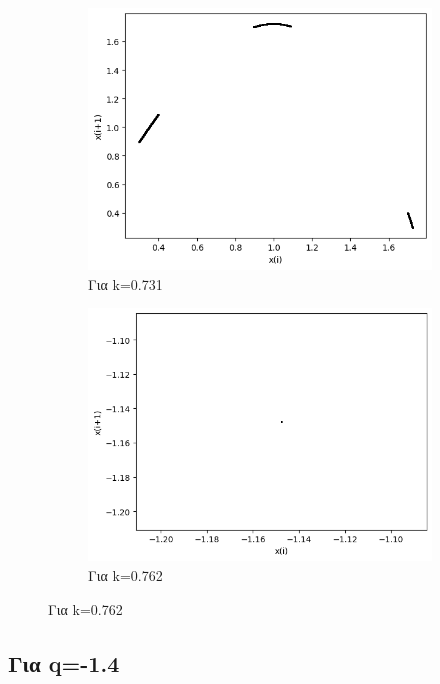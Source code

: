 \begin{figure}[h!]
\begin{subfigure}[b]{0.25\textwidth}
		\includegraphics[width=\textwidth]{LateX images/graphs q12/g11}
		\caption{Για k=0.731}
		\label{f:k67}
	\end{subfigure}
	\hfill
	\begin{subfigure}[b]{0.25\textwidth}
		\centering
		\includegraphics[width=\textwidth]{LateX images/graphs q12/g12}
		\caption{Για k=0.762}
	\end{subfigure}
	\hfill
	
\end{figure}

\clearpage

\subsection{Για q=-1.4}

